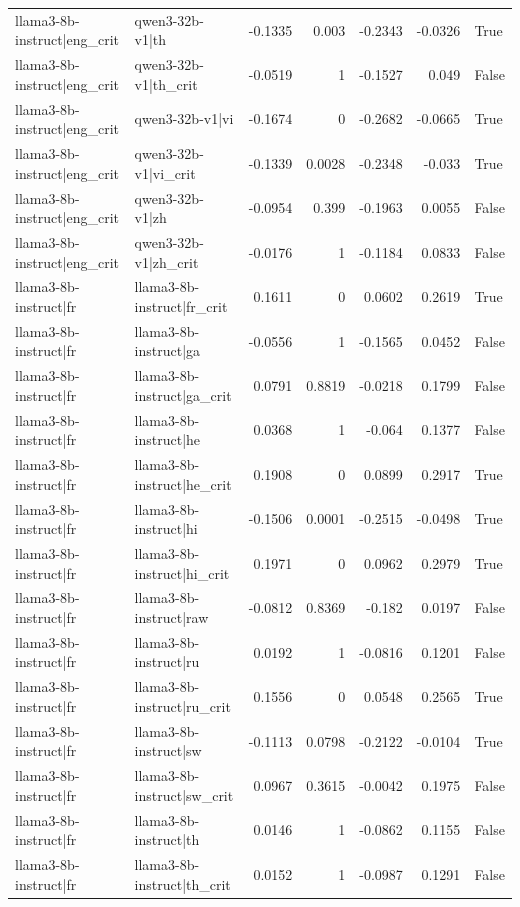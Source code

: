 \begin{table}
\begin{tabular}{l l r r r r l}
llama3-8b-instruct|eng_crit & qwen3-32b-v1|th & -0.1335 & 0.003 & -0.2343 & -0.0326 & True \\
llama3-8b-instruct|eng_crit & qwen3-32b-v1|th_crit & -0.0519 & 1 & -0.1527 & 0.049 & False \\
llama3-8b-instruct|eng_crit & qwen3-32b-v1|vi & -0.1674 & 0 & -0.2682 & -0.0665 & True \\
llama3-8b-instruct|eng_crit & qwen3-32b-v1|vi_crit & -0.1339 & 0.0028 & -0.2348 & -0.033 & True \\
llama3-8b-instruct|eng_crit & qwen3-32b-v1|zh & -0.0954 & 0.399 & -0.1963 & 0.0055 & False \\
llama3-8b-instruct|eng_crit & qwen3-32b-v1|zh_crit & -0.0176 & 1 & -0.1184 & 0.0833 & False \\
llama3-8b-instruct|fr & llama3-8b-instruct|fr_crit & 0.1611 & 0 & 0.0602 & 0.2619 & True \\
llama3-8b-instruct|fr & llama3-8b-instruct|ga & -0.0556 & 1 & -0.1565 & 0.0452 & False \\
llama3-8b-instruct|fr & llama3-8b-instruct|ga_crit & 0.0791 & 0.8819 & -0.0218 & 0.1799 & False \\
llama3-8b-instruct|fr & llama3-8b-instruct|he & 0.0368 & 1 & -0.064 & 0.1377 & False \\
llama3-8b-instruct|fr & llama3-8b-instruct|he_crit & 0.1908 & 0 & 0.0899 & 0.2917 & True \\
llama3-8b-instruct|fr & llama3-8b-instruct|hi & -0.1506 & 0.0001 & -0.2515 & -0.0498 & True \\
llama3-8b-instruct|fr & llama3-8b-instruct|hi_crit & 0.1971 & 0 & 0.0962 & 0.2979 & True \\
llama3-8b-instruct|fr & llama3-8b-instruct|raw & -0.0812 & 0.8369 & -0.182 & 0.0197 & False \\
llama3-8b-instruct|fr & llama3-8b-instruct|ru & 0.0192 & 1 & -0.0816 & 0.1201 & False \\
llama3-8b-instruct|fr & llama3-8b-instruct|ru_crit & 0.1556 & 0 & 0.0548 & 0.2565 & True \\
llama3-8b-instruct|fr & llama3-8b-instruct|sw & -0.1113 & 0.0798 & -0.2122 & -0.0104 & True \\
llama3-8b-instruct|fr & llama3-8b-instruct|sw_crit & 0.0967 & 0.3615 & -0.0042 & 0.1975 & False \\
llama3-8b-instruct|fr & llama3-8b-instruct|th & 0.0146 & 1 & -0.0862 & 0.1155 & False \\
llama3-8b-instruct|fr & llama3-8b-instruct|th_crit & 0.0152 & 1 & -0.0987 & 0.1291 & False \\

\end{tabular}
\end{table}
